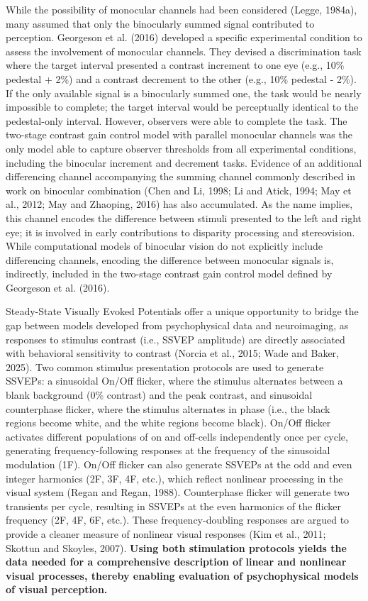 \documentclass[
  12pt,
]{article}
\begin{document}
While the possibility of monocular channels had been considered (Legge,
1984a), many assumed that only the binocularly summed signal contributed
to perception. Georgeson et al. (2016) developed a specific experimental
condition to assess the involvement of monocular channels. They devised
a discrimination task where the target interval presented a contrast
increment to one eye (e.g., 10\% pedestal + 2\%) and a contrast
decrement to the other (e.g., 10\% pedestal - 2\%). If the only
available signal is a binocularly summed one, the task would be nearly
impossible to complete; the target interval would be perceptually
identical to the pedestal-only interval. However, observers were able to
complete the task. The two-stage contrast gain control model with
parallel monocular channels was the only model able to capture observer
thresholds from all experimental conditions, including the binocular
increment and decrement tasks. Evidence of an additional differencing
channel accompanying the summing channel commonly described in work on
binocular combination (Chen and Li, 1998; Li and Atick, 1994; May et
al., 2012; May and Zhaoping, 2016) has also accumulated. As the name
implies, this channel encodes the difference between stimuli presented
to the left and right eye; it is involved in early contributions to
disparity processing and stereovision. While computational models of
binocular vision do not explicitly include differencing channels,
encoding the difference between monocular signals is, indirectly,
included in the two-stage contrast gain control model defined by
Georgeson et al. (2016).

Steady-State Visually Evoked Potentials offer a unique opportunity to
bridge the gap between models developed from psychophysical data and
neuroimaging, as responses to stimulus contrast (i.e., SSVEP amplitude)
are directly associated with behavioral sensitivity to contrast (Norcia
et al., 2015; Wade and Baker, 2025). Two common stimulus presentation
protocols are used to generate SSVEPs: a sinusoidal On/Off flicker,
where the stimulus alternates between a blank background (0\% contrast)
and the peak contrast, and sinusoidal counterphase flicker, where the
stimulus alternates in phase (i.e., the black regions become white, and
the white regions become black). On/Off flicker activates different
populations of on and off-cells independently once per cycle, generating
frequency-following responses at the frequency of the sinusoidal
modulation (1F). On/Off flicker can also generate SSVEPs at the odd and
even integer harmonics (2F, 3F, 4F, etc.), which reflect nonlinear
processing in the visual system (Regan and Regan, 1988). Counterphase
flicker will generate two transients per cycle, resulting in SSVEPs at
the even harmonics of the flicker frequency (2F, 4F, 6F, etc.). These
frequency-doubling responses are argued to provide a cleaner measure of
nonlinear visual responses (Kim et al., 2011; Skottun and Skoyles,
2007). \textbf{Using both stimulation protocols yields the data needed
for a comprehensive description of linear and nonlinear visual
processes, thereby enabling evaluation of psychophysical models of
visual perception.}
\end{document}
